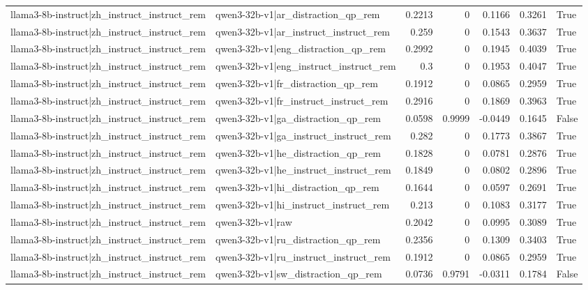 \begin{table}
\begin{tabular}{l l r r r r l}
llama3-8b-instruct|zh_instruct_instruct_rem & qwen3-32b-v1|ar_distraction_qp_rem & 0.2213 & 0 & 0.1166 & 0.3261 & True \\
llama3-8b-instruct|zh_instruct_instruct_rem & qwen3-32b-v1|ar_instruct_instruct_rem & 0.259 & 0 & 0.1543 & 0.3637 & True \\
llama3-8b-instruct|zh_instruct_instruct_rem & qwen3-32b-v1|eng_distraction_qp_rem & 0.2992 & 0 & 0.1945 & 0.4039 & True \\
llama3-8b-instruct|zh_instruct_instruct_rem & qwen3-32b-v1|eng_instruct_instruct_rem & 0.3 & 0 & 0.1953 & 0.4047 & True \\
llama3-8b-instruct|zh_instruct_instruct_rem & qwen3-32b-v1|fr_distraction_qp_rem & 0.1912 & 0 & 0.0865 & 0.2959 & True \\
llama3-8b-instruct|zh_instruct_instruct_rem & qwen3-32b-v1|fr_instruct_instruct_rem & 0.2916 & 0 & 0.1869 & 0.3963 & True \\
llama3-8b-instruct|zh_instruct_instruct_rem & qwen3-32b-v1|ga_distraction_qp_rem & 0.0598 & 0.9999 & -0.0449 & 0.1645 & False \\
llama3-8b-instruct|zh_instruct_instruct_rem & qwen3-32b-v1|ga_instruct_instruct_rem & 0.282 & 0 & 0.1773 & 0.3867 & True \\
llama3-8b-instruct|zh_instruct_instruct_rem & qwen3-32b-v1|he_distraction_qp_rem & 0.1828 & 0 & 0.0781 & 0.2876 & True \\
llama3-8b-instruct|zh_instruct_instruct_rem & qwen3-32b-v1|he_instruct_instruct_rem & 0.1849 & 0 & 0.0802 & 0.2896 & True \\
llama3-8b-instruct|zh_instruct_instruct_rem & qwen3-32b-v1|hi_distraction_qp_rem & 0.1644 & 0 & 0.0597 & 0.2691 & True \\
llama3-8b-instruct|zh_instruct_instruct_rem & qwen3-32b-v1|hi_instruct_instruct_rem & 0.213 & 0 & 0.1083 & 0.3177 & True \\
llama3-8b-instruct|zh_instruct_instruct_rem & qwen3-32b-v1|raw & 0.2042 & 0 & 0.0995 & 0.3089 & True \\
llama3-8b-instruct|zh_instruct_instruct_rem & qwen3-32b-v1|ru_distraction_qp_rem & 0.2356 & 0 & 0.1309 & 0.3403 & True \\
llama3-8b-instruct|zh_instruct_instruct_rem & qwen3-32b-v1|ru_instruct_instruct_rem & 0.1912 & 0 & 0.0865 & 0.2959 & True \\
llama3-8b-instruct|zh_instruct_instruct_rem & qwen3-32b-v1|sw_distraction_qp_rem & 0.0736 & 0.9791 & -0.0311 & 0.1784 & False \\

\end{tabular}
\end{table}
